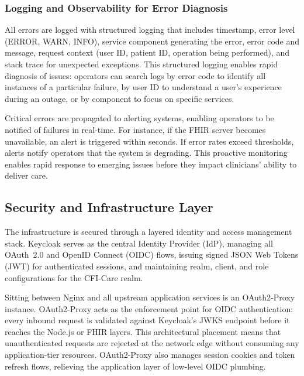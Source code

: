 
\subsubsection{Logging and Observability for Error Diagnosis}
All errors are logged with structured logging that includes timestamp, error
level (ERROR, WARN, INFO), service component generating the error, error code
and message, request context (user ID, patient ID, operation being performed),
and stack trace for unexpected exceptions. This structured logging enables
rapid diagnosis of issues: operators can search logs by error code to identify
all instances of a particular failure, by user ID to understand a user's
experience during an outage, or by component to focus on specific services.

Critical errors are propagated to alerting systems, enabling operators to be
notified of failures in real-time. For instance, if the FHIR server becomes
unavailable, an alert is triggered within seconds. If error rates exceed
thresholds, alerts notify operators that the system is degrading. This
proactive monitoring enables rapid response to emerging issues before they
impact clinicians' ability to deliver care.

\subsection{Security and Infrastructure Layer}

The infrastructure is secured through a layered identity and access management
stack. Keycloak serves as the central Identity Provider (IdP), managing all
OAuth~2.0 and OpenID Connect (OIDC) flows, issuing signed JSON Web Tokens
(JWT) for authenticated sessions, and maintaining realm, client, and role
configurations for the CFI-Care realm.

Sitting between Nginx and all upstream application services is an OAuth2-Proxy
instance. OAuth2-Proxy acts as the enforcement point for OIDC authentication:
every inbound request is validated against Keycloak's JWKS endpoint before
it reaches the Node.js or FHIR layers. This architectural placement means that
unauthenticated requests are rejected at the network edge without consuming
any application-tier resources. OAuth2-Proxy also manages session cookies and
token refresh flows, relieving the application layer of low-level OIDC
plumbing.

